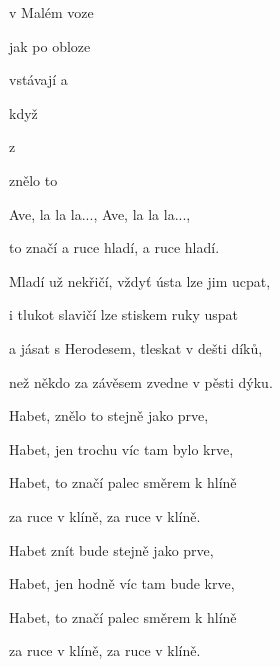

\zs
{} v Malém voze  

 jak po obloze  

 vstávají a  

  když  
\ks

\zr
{}  z 

 znělo to  

  

  

Ave, la la la..., Ave, la la la...,

 to značí  a ruce hladí, a ruce hladí.
\kr

\zs
Mladí už nekřičí, vždyť ústa lze jim ucpat,

i tlukot slavičí lze stiskem ruky uspat

a jásat s Herodesem, tleskat v dešti díků,

než někdo za závěsem zvedne v pěsti dýku.
\ks

\zr
Habet, znělo to stejně jako prve,

Habet, jen trochu víc tam bylo krve,

Habet, to značí palec směrem k hlíně

za ruce v klíně, za ruce v klíně.

Habet znít bude stejně jako prve,

Habet, jen hodně víc tam bude krve,

Habet, to značí palec směrem k hlíně

za ruce v klíně, za ruce v klíně.
\kr

\kp
